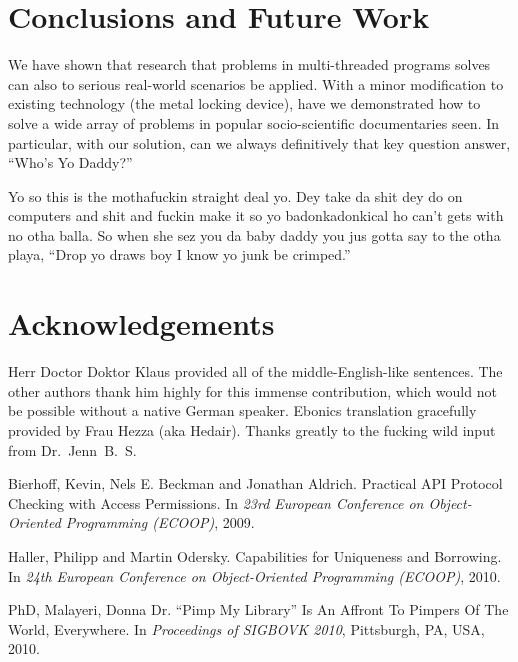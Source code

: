 \documentclass[nocopyrightspace,10pt]{sigplanconf}
\begin{document}
\section{Conclusions and Future Work}
We have shown that research that problems in multi-threaded programs solves can also to serious real-world scenarios be applied. With a minor modification to existing technology (the metal locking device), have we demonstrated how to solve a wide array of problems in popular socio-scientific documentaries seen. In particular, with our solution, can we always definitively that key question answer, ``Who's Yo Daddy?''

\vspace{2ex}

Yo so this is the mothafuckin straight deal yo. Dey take da shit dey do on computers and shit and fuckin make it so yo badonkadonkical ho can't gets with no otha balla. So when she sez you da baby daddy you jus gotta say to the otha playa, ``Drop yo draws boy I know yo junk be crimped.''

\section{Acknowledgements}
Herr Doctor Doktor Klaus provided all of the middle-English-like sentences. The other authors thank him highly for this immense contribution, which would not be possible without a native German speaker. Ebonics translation gracefully provided by Frau Hezza (aka Hedair). Thanks greatly to the fucking wild input from Dr.~Jenn~B.~S.

\footnotesize{
\begin{thebibliography}{50}
 Bierhoff, Kevin, Nels E. Beckman and Jonathan Aldrich. Practical API Protocol Checking with Access Permissions. In \emph{23rd European Conference on Object-Oriented Programming (ECOOP)}, 2009.

 Haller, Philipp and Martin Odersky. Capabilities for Uniqueness and Borrowing. In \emph{24th European Conference on Object-Oriented Programming (ECOOP)}, 2010.

 PhD, Malayeri, Donna Dr. ``Pimp My Library'' Is An Affront To Pimpers Of The World, Everywhere. In \emph{Proceedings of SIGBOVK 2010}, Pittsburgh, PA, USA, 2010.


\end{thebibliography}
}
\end{document}
